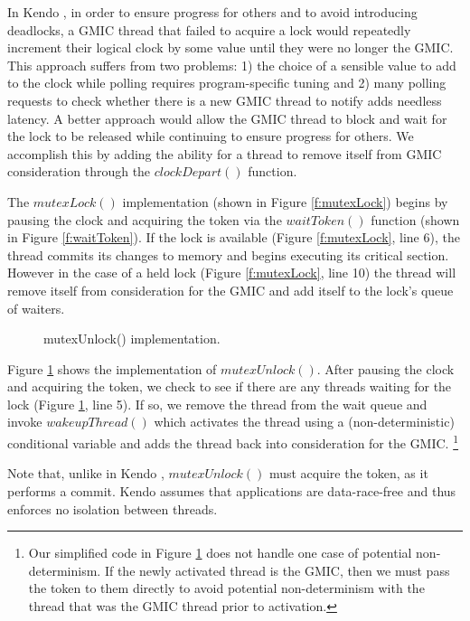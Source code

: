 In Kendo \cite{olszewski_kendo:_2009}, in order to ensure progress for others and to avoid introducing deadlocks, a GMIC thread that failed to acquire a lock would repeatedly increment their logical clock by some value until they were no longer the GMIC. This approach suffers from two problems: 1) the choice of a sensible value to add to the clock while polling requires program-specific tuning and 2) many polling requests to check whether there is a new GMIC thread to notify adds needless latency. A better approach would allow the GMIC thread to block and wait for the lock to be released while continuing to ensure progress for others. We accomplish this by adding the ability for a thread to remove itself from GMIC consideration through the $clockDepart()$ function. 

The $mutexLock()$ implementation (shown in Figure \ref{f:mutexLock}) begins by pausing the clock and acquiring the token via the $waitToken()$ function (shown in Figure \ref{f:waitToken}). If the lock is available (Figure \ref{f:mutexLock}, line 6), the thread commits its changes to memory and begins executing its critical section. However in the case of a held lock (Figure \ref{f:mutexLock}, line 10) the thread will remove itself from consideration for the GMIC and add itself to the lock's queue of waiters.

\begin{figure}
\hspace*{.5cm}
\usebox{\mutexUnlock}
\caption{mutexUnlock() implementation.}
\label{f:mutexUnlock}
\end{figure}


Figure \ref{f:mutexUnlock} shows the implementation of $mutexUnlock()$. After pausing the clock and acquiring the token, we check to see if there are any threads waiting for the lock (Figure \ref{f:mutexUnlock}, line 5). If so, we remove the thread from the wait queue and invoke $wakeupThread()$ which activates the thread using a (non-deterministic) conditional variable and adds the thread back into consideration for the GMIC. \footnote{Our simplified code in Figure \ref{f:mutexUnlock} does not handle one case of potential non-determinism. If the newly activated thread is the GMIC, then we must pass the token to them directly to avoid potential non-determinism with the thread that was the GMIC thread prior to activation.}

Note that, unlike in Kendo \cite{olszewski_kendo:_2009}, $mutexUnlock()$ must acquire the token, as it performs a commit. Kendo assumes that applications are data-race-free and thus enforces no isolation between threads.




